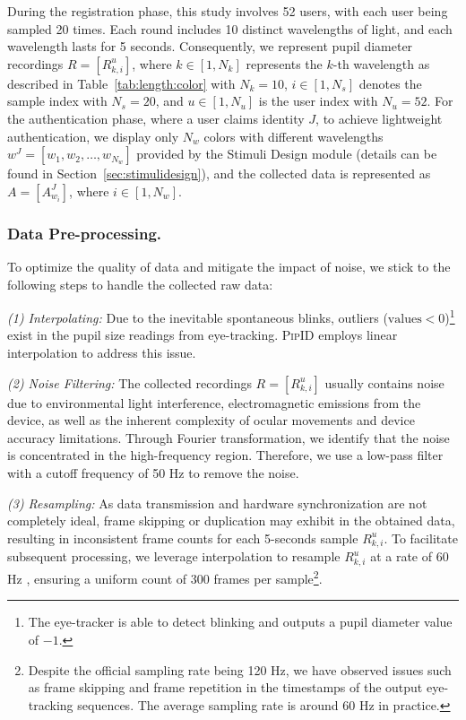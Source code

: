 \documentclass[sigconf]{acmart}
\newcommand{\sysname}{\textsc{PipID}\xspace}
\begin{document}
During the registration phase, this study involves 52 users, with each user being sampled 20 times. Each round includes 10 distinct wavelengths of light, and each wavelength lasts for 5 seconds. Consequently, we represent pupil diameter recordings $R = [R_{k,i}^u]$, where $k \in [1, N_k]$ represents the $k$-th wavelength as described in Table~\ref{tab:length:color} with $N_k = 10$, $i \in [1, N_s]$ denotes the sample index with $N_s = 20$, and $u \in [1, N_u]$ is the user index with $N_u = 52$. For the authentication phase, where a user claims identity $J$, to achieve lightweight authentication, we display only $N_w$ colors with different wavelengths $w^J = [w_1, w_2, \dots, w_{N_w}]$ provided by the Stimuli Design module (details can be found in Section~\ref{sec:stimulidesign}), and the collected data is represented as $A = [A_{w_i}^J]$, where $i \in [1, {N_w}]$.

\subsubsection{Data Pre-processing.} To optimize the quality of data and mitigate the impact of noise, we stick to the following steps to handle the collected raw data:

\textit{(1) Interpolating:} Due to the inevitable spontaneous blinks, outliers ($\text{values} < 0$)\footnote{The eye-tracker is able to detect blinking and outputs a pupil diameter value of $-1$.} exist in the pupil size readings from eye-tracking. \sysname employs linear interpolation to address this issue.

\textit{(2) Noise Filtering:} The collected recordings $R = [R_{k,i}^u]$ usually contains noise due to environmental light interference, electromagnetic emissions from the device, as well as the inherent complexity of ocular movements and device accuracy limitations. Through Fourier transformation, we identify that the noise is concentrated in the high-frequency region. Therefore, we use a low-pass filter with a cutoff frequency of 50 Hz to remove the noise.

\textit{(3) Resampling:} As data transmission and hardware synchronization are not completely ideal, frame skipping or duplication may exhibit in the obtained data, resulting in inconsistent frame counts for each 5-seconds sample $R_{k,i}^u$. To facilitate subsequent processing, we leverage interpolation to resample $R_{k,i}^u$ at a rate of 60 Hz , ensuring a uniform count of 300 frames per sample\footnote{Despite the official sampling rate being 120 Hz, we have observed issues such as frame skipping and frame repetition in the timestamps of the output eye-tracking sequences. The average sampling rate is around 60 Hz in practice.}.
\end{document}
